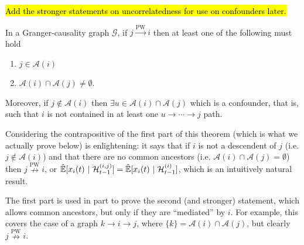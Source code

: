 \documentclass[12pt]{article}
\def\pwgc{\overset{\text{PW}}{\rightarrow}}  %
\def\npwgc{\overset{\text{PW}}{\nrightarrow}}  %
\def\gcg{\mathcal{G}}  %
\def\H{\mathcal{H}}  %
\newcommand{\linE}[2]{\hat{\E}[#1\ |\ #2]}  %
\newcommand{\anc}[1]{\mathcal{A}(#1)}  %
\newcommand{\gcgpath}[2]{#1 \rightarrow \cdots \rightarrow #2}  %
\begin{document}
\begin{proposition}
  \label{prop:ancestor_properties}
  \hl{Add the stronger statements on uncorrelatedness for use on confounders later.}

  In a Granger-causality graph $\gcg$, if $j \pwgc i$ then at least
  one of the following must hold

  \begin{enumerate}
    \item{$j \in \anc{i}$}
    \item{$\anc{i} \cap \anc{j} \ne \emptyset$.}
  \end{enumerate}

  Moreover, if $j \not\in \anc{i}$ then $\exists u \in \anc{i} \cap \anc{j}$ which is a confounder, that is, such that $i$ is not contained in at least one $\gcgpath{u}{j}$ path.
\end{proposition}

\begin{remark}
  Considering the contrapositive of the first part of this theorem (which is what we actually prove below) is enlightening: it says that if $i$ is not a descendent of $j$ (i.e. $j \not \in \anc{i}$) and that there are no common ancestors (i.e. $\anc{i} \cap \anc{j} = \emptyset$) then $j \npwgc i$, or $\linE{x_i(t)}{\H_{t - 1}^{(i, j)}} = \linE{x_i(t)}{\H_{t - 1}^{(i)}}$, which is an intuitively natural result.

  The first part is used in part to prove the second (and stronger) statement, which allows common ancestors, but only if they are ``mediated'' by $i$.  For example, this covers the case of a graph $k \rightarrow i \rightarrow j$, where $\{k\} = \anc{i} \cap \anc{j}$, but clearly $j \npwgc i$.
\end{remark}
\end{document}
